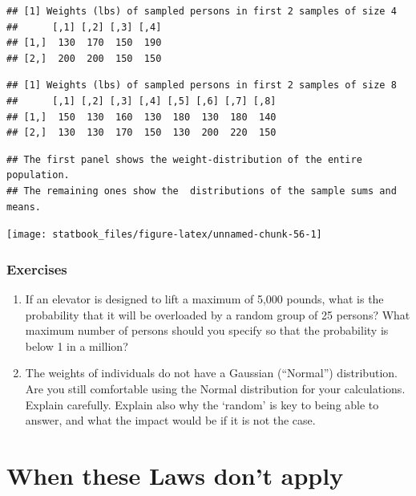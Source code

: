 \documentclass[]{book}
\begin{document}
\begin{verbatim}
## [1] Weights (lbs) of sampled persons in first 2 samples of size 4
##      [,1] [,2] [,3] [,4]
## [1,]  130  170  150  190
## [2,]  200  200  150  150
\end{verbatim}

\begin{verbatim}
## [1] Weights (lbs) of sampled persons in first 2 samples of size 8
##      [,1] [,2] [,3] [,4] [,5] [,6] [,7] [,8]
## [1,]  150  130  160  130  180  130  180  140
## [2,]  130  130  170  150  130  200  220  150
\end{verbatim}

\begin{verbatim}
## The first panel shows the weight-distribution of the entire population.
## The remaining ones show the  distributions of the sample sums and means.
\end{verbatim}

\begin{center}\texttt{[image: statbook\_files/figure-latex/unnamed-chunk-56-1]} \end{center}

\hypertarget{exercises-4}{%
\subsubsection{Exercises}\label{exercises-4}}

\begin{enumerate}
\def\labelenumi{\arabic{enumi}.}
\item
  If an elevator is designed to lift a maximum of 5,000 pounds, what is the probability that it will be overloaded by a random group of 25 persons? What maximum number of persons should you specify so that the probability is below 1 in a million?
\item
  The weights of individuals do not have a Gaussian (``Normal'') distribution. Are you still comfortable using the Normal distribution for your calculations. Explain carefully. Explain also why the `random' is key to being able to answer, and what the impact would be if it is not the case.
\end{enumerate}

\hypertarget{when-these-laws-dont-apply}{%
\section{When these Laws don't apply}\label{when-these-laws-dont-apply}}
\end{document}
